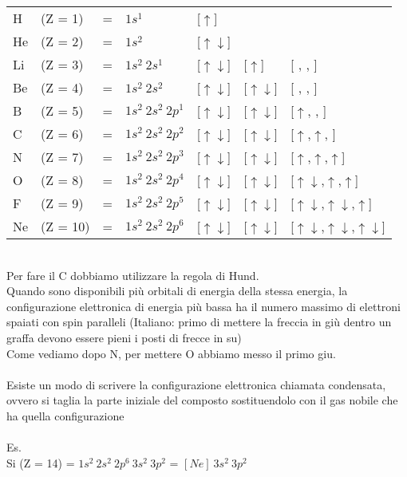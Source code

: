 \begin{tabular}{l l l l lll}
  H	&(Z = 1) &=	&$1s^1$&[$\uparrow$]\\
  He&(Z = 2) &= &$1s^2$&[$\uparrow$$\downarrow$]&\\
  Li&(Z = 3) &= &$1s^2\ 2s^1$&[$\uparrow$$\downarrow$]&[$\uparrow$]&[ , , ]\\
  Be&(Z = 4) &= &$1s^2\ 2s^2$&[$\uparrow$$\downarrow$]&[$\uparrow$$\downarrow$]&[ , , ]\\
  B	&(Z = 5) &= &$1s^2\ 2s^2\ 2p^1$&[$\uparrow$$\downarrow$]&[$\uparrow$$\downarrow$]&[$\uparrow$, , ]\\
  C	&(Z = 6) &= &$1s^2\ 2s^2\ 2p^2$&[$\uparrow$$\downarrow$]&[$\uparrow$$\downarrow$]&[$\uparrow$,$\uparrow$, ]\\
  N	&(Z = 7) &= &$1s^2\ 2s^2\ 2p^3$&[$\uparrow$$\downarrow$]&[$\uparrow$$\downarrow$]&[$\uparrow$,$\uparrow$,$\uparrow$]\\
  O	&(Z = 8) &= &$1s^2\ 2s^2\ 2p^4$&[$\uparrow$$\downarrow$]&[$\uparrow$$\downarrow$]&[$\uparrow$$\downarrow$,$\uparrow$,$\uparrow$]\\
  F	&(Z = 9) &= &$1s^2\ 2s^2\ 2p^5$&[$\uparrow$$\downarrow$]&[$\uparrow$$\downarrow$]&[$\uparrow$$\downarrow$,$\uparrow$$\downarrow$,$\uparrow$]\\
  Ne&(Z = 10) &= &$1s^2\ 2s^2\ 2p^6$&[$\uparrow$$\downarrow$]&[$\uparrow$$\downarrow$]&[$\uparrow$$\downarrow$,$\uparrow$$\downarrow$,$\uparrow$$\downarrow$]\\
\end{tabular}\\
Per fare il C dobbiamo utilizzare la regola di Hund.\\
Quando sono disponibili più orbitali di energia della stessa energia, la configurazione elettronica di energia più bassa ha il numero massimo di elettroni spaiati con spin paralleli (Italiano: primo di mettere la freccia in giù dentro un graffa devono essere pieni i posti di frecce in su)\\
Come vediamo dopo N, per mettere O abbiamo messo il primo giu.\\\\
Esiste un modo di scrivere la configurazione elettronica chiamata condensata, ovvero si taglia la parte iniziale del composto sostituendolo con il gas nobile che ha quella configurazione\\\\
Es. \\
Si	(Z = 14) = $1s^2\ 2s^2\ 2p^6\ 3s^2\ 3p^2$ = $[Ne]\ 3s^2\ 3p^2$\\\\
